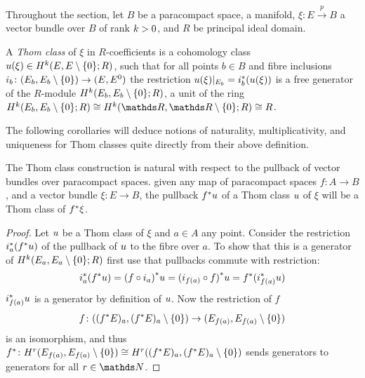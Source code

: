 Throughout the section,
let $B$ be a paracompact space, \forexample a manifold,
$\xi\colon E\xrightarrow{p} B$ a vector bundle over $B$ of rank $k>0$,
and $R$ be principal ideal domain.
\begin{Def}
  A \emph{Thom class} of $\xi$ in $R$-coefficients is a
  cohomology class ${u}(\xi)\in H^{k}(E, {E}\setminus\{0\}; R)$,
  such that for all points $b\in B$ and fibre inclusions
  $i_b\colon (E_b, {E_b}\setminus\{0\}) \to (E, {E}^0)$
  the restriction ${u}(\xi)|_{E_b} = {i}^*_b ({u}(\xi))$ is a
  free generator of the $R$-module $H^{k}(E_b, {E_b}\setminus\{0\}; R)$,
  \idest a unit
  of the ring
  $\H^{\rkk}(\spherepair{E_b};R)\cong \H^{\rkk}(\spherepair{\R}; R)\cong R$.
\end{Def}

The following corollaries will deduce notions of naturality,
multiplicativity, and uniqueness for Thom classes quite directly from
their above definition.

\begin{Cor}\label{cor:thomclsnatural}
  The Thom class construction is natural with respect to the pullback
  of vector bundles over paracompact spaces.
  \Idest given any map of paracompact spaces $f\colon A\to B$, and a
  vector bundle $\xi\colon E\to B$,
  the pullback ${f}^* u$ of a Thom class $u$ of $\xi$ will
  be a Thom class of ${f}^* \xi$.
  \begin{proof}
    Let $u$ be a Thom class of $\xi$ and $a\in A$ any point.
    Consider the restriction ${i}^*_a({f}^* u)$
    of the pullback of $u$ to the fibre over $a$. To show that this
    is a generator of $H^{k}(E_a, {E_a}\setminus\{0\};R)$ first use that
    pullbacks commute with restriction:
    \begin{gather*}
      {i}^*_a({f}^* u)
      = {(f\circ i_a)}^* u
      = {(i_{f(a)}\circ f)}^* u
      = {f}^* ({i}^*_{f(a)} u)
    \end{gather*}
    ${i}^*_{f(a)} u$ is a generator by definition of $u$.
    Now the restriction of $f$
    \begin{gather*}
      f\colon (({f}^* E)_a, {({f}^* E)_a}\setminus\{0\}) \to (E_{f(a)}, {E_{f(a)}}\setminus\{0\})
    \end{gather*}
    is an isomorphism, and thus
    ${f}^*\colon H^r(E_{f(a)}, {E_{f(a)}}\setminus\{0\})
    \cong H^r(({f}^* E)_a, {({f}^* E)_a}\setminus\{0\})$
    sends generators to generators for all $r\in\Nat$.
  \end{proof}
\end{Cor}


